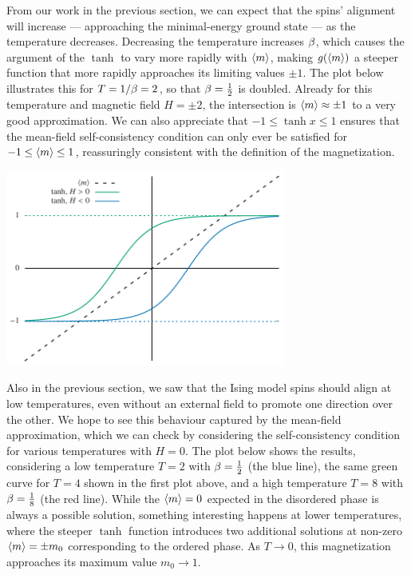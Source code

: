 From our work in the previous section, we can expect that the spins' alignment will increase --- approaching the minimal-energy ground state --- as the temperature decreases.
Decreasing the temperature increases $\beta$, which causes the argument of the $\tanh$ to vary more rapidly with $\left\langle m \right\rangle$, making $g(\left\langle m \right\rangle)$ a steeper function that more rapidly approaches its limiting values $\pm 1$.
The plot below illustrates this for $T = 1 / \beta = 2$, so that $\beta = \frac{1}{2}$ is doubled.
Already for this temperature and magnetic field $H = \pm 2$, the intersection is $\left\langle m \right\rangle \approx \pm 1$ to a very good approximation.
We can also appreciate that $-1 \leq \tanh x \leq 1$ ensures that the mean-field self-consistency condition can only ever be satisfied for $-1 \leq \left\langle m \right\rangle \leq 1$, reassuringly consistent with the definition of the magnetization. \\[-24 pt]
\begin{center}\includegraphics[width=0.69\textwidth]{figs/unit09_consistency_H-beta.pdf}\end{center} %

Also in the previous section, we saw that the Ising model spins should align at low temperatures, even without an external field to promote one direction over the other.
We hope to see this behaviour captured by the mean-field approximation, which we can check by considering the self-consistency condition for various temperatures with $H = 0$.
The plot below shows the results, considering a low temperature $T = 2$ with $\beta = \frac{1}{2}$ (the blue line), the same green curve for $T = 4$ shown in the first plot above, and a high temperature $T = 8$ with $\beta = \frac{1}{8}$ (the red line).
While the $\left\langle m \right\rangle = 0$ expected in the disordered phase is always a possible solution, something interesting happens at lower temperatures, where the steeper $\tanh$ function introduces two additional solutions at non-zero $\left\langle m \right\rangle = \pm m_0$ corresponding to the ordered phase.
As $T \to 0$, this magnetization approaches its maximum value $m_0 \to 1$.

